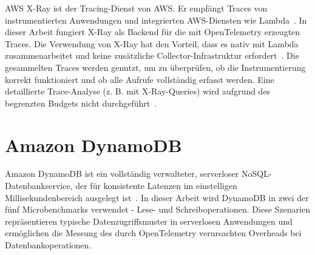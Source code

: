 AWS X-Ray ist der Tracing-Dienst von AWS. Er empfängt Traces von instrumentierten Anwendungen und integrierten AWS-Diensten wie Lambda~\cite{AWSXRayDocs}.  
In dieser Arbeit fungiert X-Ray als Backend für die mit OpenTelemetry erzeugten Traces. Die Verwendung von X-Ray hat den Vorteil, dass es nativ mit Lambda zusammenarbeitet und keine zusätzliche Collector-Infrastruktur erfordert~\cite{ADOT_Lambda}.  
Die gesammelten Traces werden genutzt, um zu überprüfen, ob die Instrumentierung korrekt funktioniert und ob alle Aufrufe vollständig erfasst werden. Eine detaillierte Trace-Analyse (z. B. mit X-Ray-Queries) wird aufgrund des begrenzten Budgets nicht durchgeführt~\cite{AWSXRayPricing}.

\section{Amazon DynamoDB}
\label{sec:dynamodb}

Amazon DynamoDB ist ein vollständig verwalteter, serverloser \ac{NoSQL}-Datenbankservice, der für konsistente Latenzen im einstelligen Millisekundenbereich ausgelegt ist~\cite{AWSDynamoDBDocs}.  
In dieser Arbeit wird DynamoDB in zwei der fünf Microbenchmarks verwendet - Lese- und Schreiboperationen. Diese Szenarien repräsentieren typische Datenzugriffsmuster in serverlosen Anwendungen und ermöglichen die Messung des durch OpenTelemetry verursachten Overheads bei Datenbankoperationen.